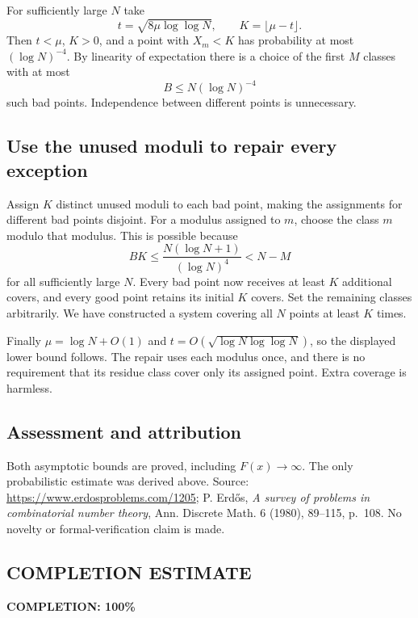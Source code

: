 For sufficiently large $N$ take
\[
 t=\sqrt{8\mu\log\log N},\qquad K=\lfloor\mu-t\rfloor.
\]
Then $t<\mu$, $K>0$, and a point with $X_m<K$ has probability at most $(\log N)^{-4}$. By linearity of expectation there is a choice of the first $M$ classes with at most
\[
 B\le N(\log N)^{-4}
\]
such bad points. Independence between different points is unnecessary.

\subsection*{Use the unused moduli to repair every exception}
Assign $K$ distinct unused moduli to each bad point, making the assignments for different bad points disjoint. For a modulus assigned to $m$, choose the class $m$ modulo that modulus. This is possible because
\[
 BK\le \frac{N(\log N+1)}{(\log N)^4}<N-M
\]
for all sufficiently large $N$. Every bad point now receives at least $K$ additional covers, and every good point retains its initial $K$ covers. Set the remaining classes arbitrarily. We have constructed a system covering all $N$ points at least $K$ times.

Finally $\mu=\log N+O(1)$ and
$t=O(\sqrt{\log N\log\log N})$, so the displayed lower bound follows. The repair uses each modulus once, and there is no requirement that its residue class cover only its assigned point. Extra coverage is harmless.

\subsection*{Assessment and attribution}
Both asymptotic bounds are proved, including $F(x)\to\infty$. The only probabilistic estimate was derived above. Source: \url{https://www.erdosproblems.com/1205}; P. Erd\H{o}s, \emph{A survey of problems in combinatorial number theory}, Ann. Discrete Math. 6 (1980), 89--115, p.~108. No novelty or formal-verification claim is made.
\subsection*{COMPLETION ESTIMATE}
\textbf{COMPLETION: 100\%}
